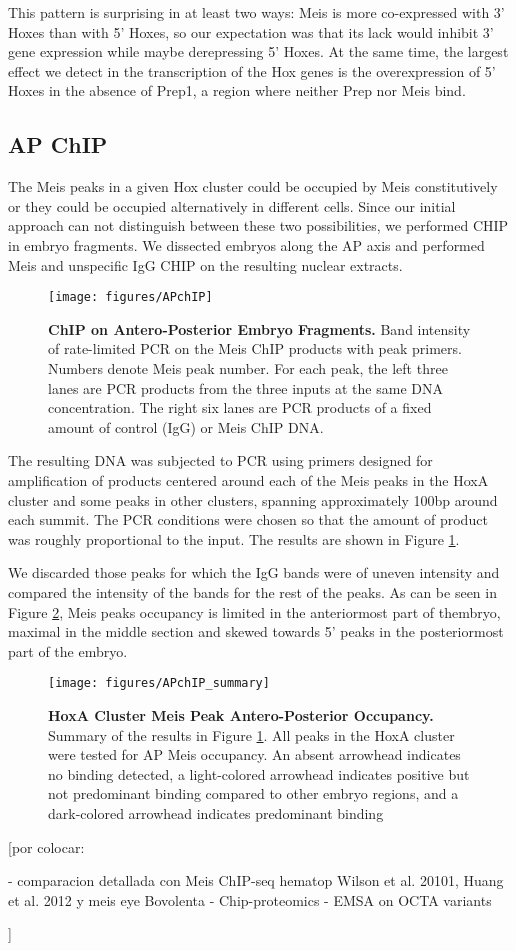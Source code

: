 This pattern is surprising in at least two ways: Meis is more co-expressed with 3' Hoxes than with 5' Hoxes, so our expectation was that its lack would inhibit 3' gene expression while maybe derepressing 5' Hoxes. At the same time, the largest effect we detect in the transcription of the Hox genes is the overexpression of 5' Hoxes in the absence of Prep1, a region where neither Prep nor Meis bind.

\subsection{AP ChIP}

The Meis peaks in a given Hox cluster could be occupied by Meis constitutively or they could be occupied alternatively in different cells. Since our initial approach can not distinguish between these two possibilities, we performed \ac{CHIP} in embryo fragments. We dissected embryos along the \ac{AP} axis and performed Meis and unspecific IgG \ac{CHIP} on the resulting nuclear extracts.

\begin{figure}[p]
  \centering
  \texttt{[image: figures/APchIP]}
  \caption[ChIP on Antero-Posterior Embryo Fragments]{\textbf{ChIP on Antero-Posterior Embryo Fragments.} Band intensity of rate-limited PCR on the Meis ChIP products with peak primers. Numbers denote Meis peak number. For each peak, the left three lanes are PCR products from the three inputs at the same DNA concentration. The right six lanes are PCR products of a fixed amount of control (IgG) or Meis ChIP DNA.}
  \label{fig:APchip}
\end{figure}

The resulting DNA was subjected to \ac{PCR} using primers designed for amplification of products centered around each of the Meis peaks in the HoxA cluster and some peaks in other clusters, spanning approximately 100bp around each summit. The PCR conditions were chosen so that the amount of product was roughly proportional to the input. The results are shown in Figure \ref{fig:APchip}. 

We discarded those peaks for which the IgG bands were of uneven intensity and compared the intensity of the bands for the rest of the peaks. As can be seen in Figure \ref{fig:APchipSummary}, Meis peaks occupancy is limited in the anteriormost part of thembryo, maximal in the middle section and skewed towards 5' peaks in the posteriormost part of the embryo.
\begin{figure}[]
  \centering
  \texttt{[image: figures/APchIP\_summary]}
  \caption[HoxA Cluster Meis Peak Antero-Posterior Occupancy]{\textbf{HoxA Cluster Meis Peak Antero-Posterior Occupancy.} Summary of the results in Figure \ref{fig:APchip}. All peaks in the HoxA cluster were tested for AP Meis occupancy. An absent arrowhead indicates no binding detected, a light-colored arrowhead indicates positive but not predominant binding compared to other embryo regions, and a dark-colored arrowhead indicates predominant binding}
  \label{fig:APchipSummary}
\end{figure}

[por colocar:

- comparacion detallada con Meis ChIP-seq hematop {Wilson et al. 20101, Huang et al. 2012} y meis eye {Bovolenta}
- Chip-proteomics
- EMSA on OCTA variants

]
